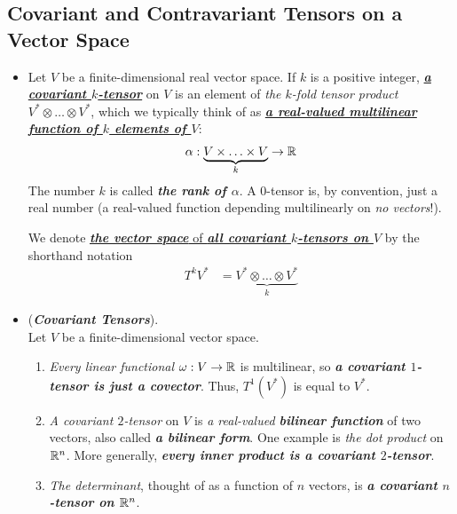 \documentclass[11pt]{article}
\begin{document}
\subsection{Covariant and Contravariant Tensors on a Vector Space}
\begin{itemize}
\item \begin{definition}
Let $V$ be a finite-dimensional real vector space. If $k$ is a positive integer, \underline{\emph{\textbf{a covariant $k$-tensor}}} on $V$ is an element of \emph{the $k$-fold tensor product} $V^{*}\otimes \ldots \otimes V^{*}$, which we typically think of as \underline{\emph{\textbf{a real-valued multilinear function of $k$ elements of $V$}}}:
\begin{align*}
\alpha: \underbrace{V\times \ldots \times V}_{k} \rightarrow {\mathbb R}
\end{align*}
The number $k$ is called \emph{\textbf{the rank of $\alpha$}}. A $0$-tensor is, by convention, just a real number (a real-valued function depending multilinearly on \emph{no vectors}!).  

We denote \underline{\emph{\textbf{the vector space}} of \emph{\textbf{all covariant $k$-tensors on $V$}}} by the shorthand notation
\begin{align*}
T^{k}V^{*} &= \underbrace{V^{*}\otimes \ldots \otimes V^{*}}_{k}
\end{align*}
\end{definition}

\item \begin{example} (\emph{\textbf{Covariant Tensors}}). \\
Let $V$ be a finite-dimensional vector space.
\begin{enumerate}
\item \emph{Every linear functional} $\omega: V \rightarrow {\mathbb R}$ is multilinear, so \emph{\textbf{a covariant $1$-tensor is just a covector}}. Thus, $T^{1}(V^{*})$ is equal to $V^{*}$.
\item  \emph{A covariant $2$-tensor} on $V$ is \emph{a real-valued \textbf{bilinear function}} of two vectors, also called \emph{\textbf{a bilinear form}}. One example is \emph{the dot product} on ${\mathbb R}^n$. More generally, \emph{\textbf{every inner product is a covariant $2$-tensor}}.
\item \emph{The determinant}, thought of as a function of $n$ vectors, is \emph{\textbf{a covariant $n$-tensor on ${\mathbb R}^n$}}.
\end{enumerate}
\end{example}


\end{itemize}
\end{document}

